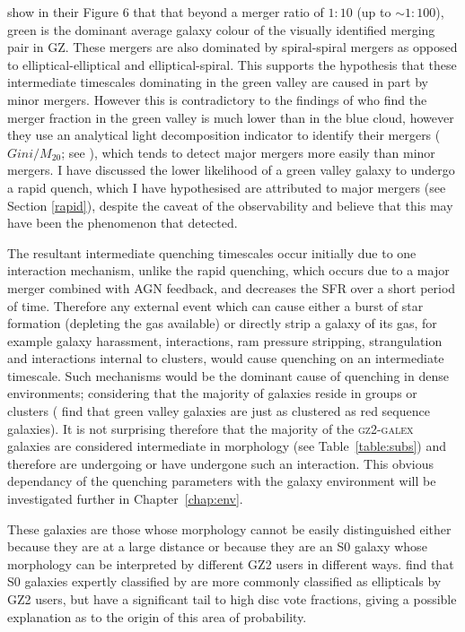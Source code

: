 \citet{Darg10a} show in their Figure 6 that that beyond a merger ratio of $1:10$ (up to $\sim 1:100$), green is the dominant average galaxy colour of the visually identified merging pair in GZ. These mergers are also dominated by spiral-spiral mergers as opposed to elliptical-elliptical and elliptical-spiral. This supports the hypothesis that these intermediate timescales dominating in the green valley are caused in part by minor mergers. However this is contradictory to the findings of \citet{Mendez11} who find the merger fraction in the green valley is much lower than in the blue cloud, however they use an analytical light decomposition indicator to identify their mergers ($Gini/M_{20}$; see \citealt{lotz08b}), which tends to detect major mergers more easily than minor mergers. I have discussed the lower likelihood of a green valley galaxy to undergo a rapid quench, which I have hypothesised are attributed to major mergers (see Section \ref{rapid}), despite the caveat of the observability and believe that this may have been the phenomenon that \citet{Mendez11} detected.

The resultant intermediate quenching timescales occur initially due to one interaction mechanism, unlike the rapid quenching, which occurs due to a major merger combined with AGN feedback, and decreases the SFR over a short period of time. Therefore any external event which can cause either a burst of star formation (depleting the gas available) or directly strip a galaxy of its gas, for example galaxy harassment, interactions, ram pressure stripping, strangulation and interactions internal to clusters, would cause quenching on an intermediate timescale. Such mechanisms would be the dominant cause of quenching in dense environments; considering that the majority of galaxies reside in groups or clusters (\citealt{Coil08} find that green valley galaxies are just as clustered as red sequence galaxies). It is not surprising therefore that the majority of the \textsc{gz2-galex} galaxies are considered intermediate in morphology (see Table~\ref{table:subs}) and therefore are undergoing or have undergone such an interaction. This obvious dependancy of the quenching parameters with the galaxy environment will be investigated further in Chapter~\ref{chap:env}.

These galaxies are those whose morphology cannot be easily distinguished either because they are at a large distance or because they are an S0 galaxy whose morphology can be interpreted by different GZ2 users in different ways. \citet{GZ2} find that S0 galaxies expertly classified by \citet{nair10} are more commonly classified as ellipticals by GZ2 users, but have a significant tail to high disc vote fractions, giving a possible explanation as to the origin of this area of probability.


